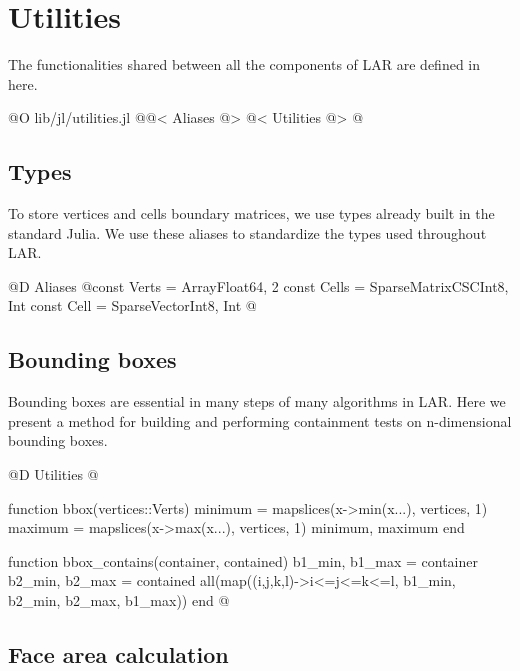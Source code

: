 \chapter{Utilities}
\label{ch:utilities}

The functionalities shared between all the components of LAR
are defined in here.

@O lib/jl/utilities.jl
@{@< Aliases @>
@< Utilities @>
@}


\section{Types}

To store vertices and cells boundary matrices, 
we use types already built in the standard Julia.
We use these aliases to standardize the types used 
throughout LAR. 

@D Aliases
@{const Verts = Array{Float64, 2}
const Cells = SparseMatrixCSC{Int8, Int}
const Cell = SparseVector{Int8, Int}
@}


\section{Bounding boxes}
\label{sec:bboxes}

Bounding boxes are essential in many steps of many
algorithms in LAR. Here we present a method for building
and performing containment tests on n-dimensional bounding boxes.

@D Utilities
@{function bbox(vertices::Verts)
    minimum = mapslices(x->min(x...), vertices, 1)
    maximum = mapslices(x->max(x...), vertices, 1)
    minimum, maximum
end

function bbox_contains(container, contained)
    b1_min, b1_max = container
    b2_min, b2_max = contained
    all(map((i,j,k,l)->i<=j<=k<=l, b1_min, b2_min, b2_max, b1_max))
end
@}


\section{Face area calculation}
\label{sec:face_area}

